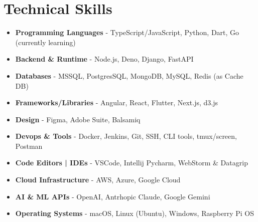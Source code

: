 \section{Technical Skills}
{
	\normalsize
	\begin{itemize}[topsep=0pt, partopsep=0pt, itemsep=0pt, parsep=0pt]
		\item \textbf{Programming Languages} - TypeScript/JavaScript, Python, Dart, Go (currently learning)
		\item \textbf{Backend \& Runtime} - Node.js, Deno, Django, FastAPI
		\item \textbf{Databases} - MSSQL, PostgresSQL, MongoDB, MySQL, Redis (as Cache DB)
		\item \textbf{Frameworks/Libraries} - Angular, React, Flutter, Next.js, d3.js
		\item \textbf{Design} - Figma, Adobe Suite, Balsamiq
		\item \textbf{Devops \& Tools} - Docker, Jenkins, Git, SSH, CLI tools, tmux/screen, Postman
		\item \textbf{Code Editors | IDEs} - VSCode, Intellij Pycharm, WebStorm \& Datagrip
		\item \textbf{Cloud Infrastructure} - AWS, Azure, Google Cloud
		\item \textbf{AI \& ML APIs} - OpenAI, Antrhopic Claude, Google Gemini
		\item \textbf{Operating Systems} - macOS, Linux (Ubuntu), Windows, Raspberry Pi OS
	\end{itemize}
}